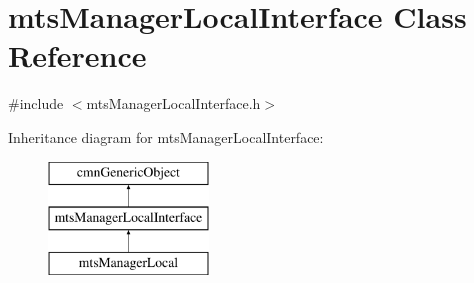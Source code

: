 \hypertarget{classmts_manager_local_interface}{\section{mts\-Manager\-Local\-Interface Class Reference}
\label{classmts_manager_local_interface}
}


{\ttfamily \#include $<$mts\-Manager\-Local\-Interface.\-h$>$}

Inheritance diagram for mts\-Manager\-Local\-Interface\-:\begin{figure}[H]
\begin{center}
\leavevmode
\includegraphics[height=3.000000cm]{d2/d2e/classmts_manager_local_interface}
\end{center}
\end{figure}
